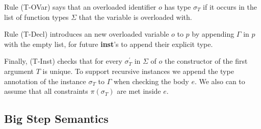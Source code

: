 \documentclass[runningheads]{llncs}
\begin{document}
Rule (T-OVar) says that an overloaded identifier $o$ has type $\sigma_T$ if it occurs in the list of function types $\Sigma$ that the variable is overloaded with. 

Rule (T-Decl) introduces an new overloaded variable $o$ to $p$ by appending $\Gamma$ in $p$ with the empty list, for future \textbf{inst}'s to append their explicit type.

Finally, (T-Inst) checks that for every $\sigma_T^\prime$ in $\Sigma$ of $o$ the constructor of the first argument $T$ is unique. To support recursive instances we append the type annotation of the instance $\sigma_T$ to $\Gamma$ when checking the body $e$. We also can to assume that all constraints $\pi(\sigma_T)$ are met inside $e$. 
\subsection{Big Step Semantics}
\label{semantics}
\end{document}
